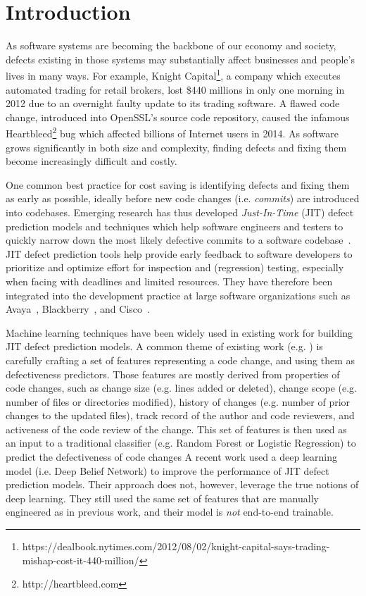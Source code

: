 \section{Introduction}
\label{sec:intro}
As software systems are becoming the backbone of our economy and society, defects existing in those systems may substantially affect businesses and people's lives  in many ways. For example, Knight Capital\footnote{https://dealbook.nytimes.com/2012/08/02/knight-capital-says-trading-mishap-cost-it-440-million/}, a company which executes automated trading  for retail brokers, lost \$440 millions in only one morning in 2012 due to an overnight faulty update to its trading software. A flawed code change, introduced into OpenSSL's source code repository, caused the infamous Heartbleed\footnote{http://heartbleed.com} bug which affected billions of Internet users in 2014. As software grows significantly in both size and complexity, finding defects and fixing them become increasingly difficult and costly.

One common best practice for cost saving is identifying defects and fixing them as early as possible, ideally before new code changes (i.e. \emph{commits}) are introduced into codebases. Emerging research has thus developed \emph{Just-In-Time} (JIT) defect prediction models and techniques which help software engineers and testers to quickly narrow down the most likely defective commits to a software codebase~\cite{KameiS16,D'Ambros:2012:EDP}. JIT defect prediction tools help provide early feedback to software developers to prioritize and optimize effort for inspection and (regression) testing, especially when facing with deadlines and limited resources. They have therefore been integrated into the development practice at large software organizations such as Avaya~\cite{Mockus2000}, Blackberry~\cite{Shihab:2012:ISR}, and Cisco~\cite{Tantithamthavorn:2015:IMP}.

Machine learning techniques have been widely used in existing work for building JIT defect prediction models. A common theme of existing work (e.g. \cite{Kamei:2013:LES,Kim:2008:CSC,Kononenko:2015,Mockus2000,McIntosh:2018:FCM}) is carefully crafting a set of features representing a code change, and using them as defectiveness predictors. Those features are mostly derived from properties of code changes, such as change size (e.g. lines added or deleted), change scope (e.g. number of files or directories modified), history of changes (e.g. number of prior changes to the updated files), track record of the author and code reviewers, and activeness of the code review of the change. This set of features is then used as an input to a traditional classifier (e.g. Random Forest or Logistic Regression) to predict the defectiveness of code changes A recent work \cite{Yang:2015:DLJ}  used a deep learning model (i.e. Deep Belief Network) to improve the performance of JIT defect prediction models. Their approach does not, however, leverage the true notions of deep learning. They still used the same set of features that are manually engineered as in previous work, and their model is \emph{not} end-to-end trainable.


